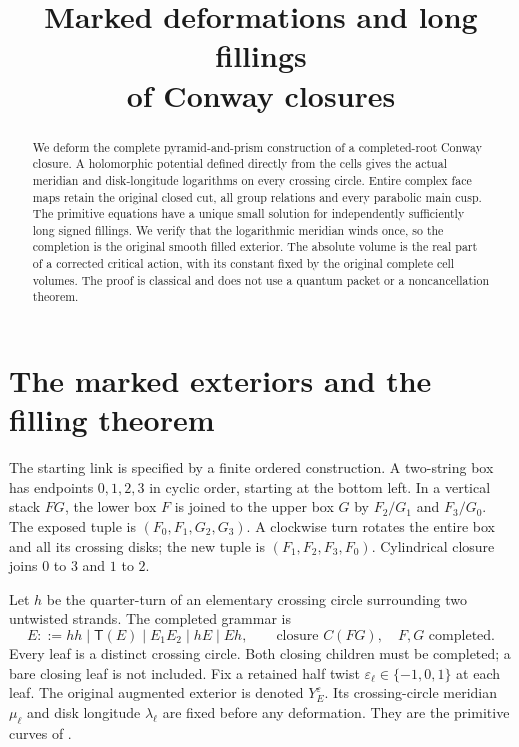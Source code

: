 \documentclass[11pt]{article}
\title{Marked deformations and long fillings\\of Conway closures}
\author{}\date{}
\numberwithin{equation}{section}
\theoremstyle{definition}\newtheorem{definition}[theorem]{Definition}
\theoremstyle{remark}\newtheorem{remark}[theorem]{Remark}
\newcommand{\Turn}{\mathsf T}
\newcommand{\eps}{\varepsilon}
\begin{document}
\maketitle

\begin{abstract}
We deform the complete pyramid-and-prism construction of a
completed-root Conway closure. A holomorphic potential defined
directly from the cells gives the actual meridian and disk-longitude
logarithms on every crossing circle. Entire complex face maps retain
the original closed cut, all group relations and every parabolic
main cusp. The primitive equations have a unique small solution
for independently sufficiently long signed fillings. We verify
that the logarithmic meridian winds once, so the completion is the
original smooth filled exterior. The absolute volume is the real
part of a corrected critical action, with its constant fixed by
the original complete cell volumes. The proof is classical and
does not use a quantum packet or a noncancellation theorem.
\end{abstract}

\section{The marked exteriors and the filling theorem}
\label{cf:intro}

The starting link is specified by a finite ordered construction.
A two-string box has endpoints $0,1,2,3$ in cyclic order, starting
at the bottom left. In a vertical stack $FG$, the lower box $F$
is joined to the upper box $G$ by $F_2/G_1$ and $F_3/G_0$.
The exposed tuple is $(F_0,F_1,G_2,G_3)$.
A clockwise turn rotates the entire box and all its crossing disks;
the new tuple is $(F_1,F_2,F_3,F_0)$.
Cylindrical closure joins $0$ to $3$ and $1$ to $2$.

Let $h$ be the quarter-turn of an elementary crossing circle
surrounding two untwisted strands. The completed grammar is
\begin{equation}\label{cf:grammar}
 E::=hh\mid\Turn(E)\mid E_1E_2\mid hE\mid Eh,
 \qquad \text{closure }C(FG),\quad F,G\text{ completed}.
\end{equation}
Every leaf is a distinct crossing circle. Both closing children
must be completed; a bare closing leaf is not included.
Fix a retained half twist $\eps_\ell\in\{-1,0,1\}$ at each leaf.
The original augmented exterior is denoted $Y^\eps_E$.
Its crossing-circle meridian $\mu_\ell$ and disk longitude
$\lambda_\ell$ are fixed before any deformation.
They are the primitive curves of \cite[Section~7]{Geometry}.
\end{document}
